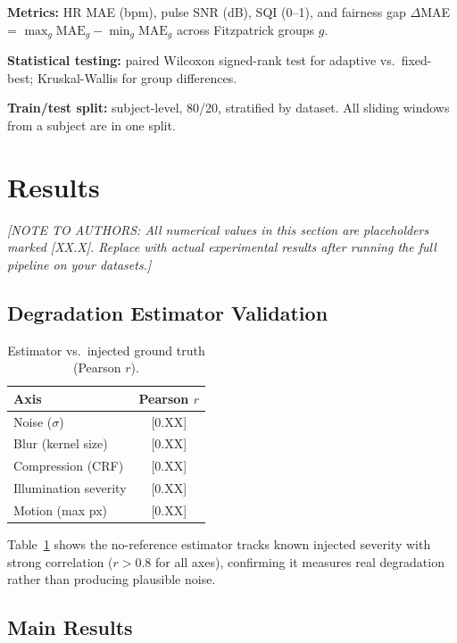 \documentclass[conference]{IEEEtran}
\begin{document}
\textbf{Metrics:} HR MAE (bpm), pulse SNR (dB), SQI (0--1), and fairness gap $\Delta$MAE = $\max_g \text{MAE}_g - \min_g \text{MAE}_g$ across Fitzpatrick groups $g$.

\textbf{Statistical testing:} paired Wilcoxon signed-rank test for adaptive vs.\ fixed-best; Kruskal-Wallis for group differences.

\textbf{Train/test split:} subject-level, 80/20, stratified by dataset. All sliding windows from a subject are in one split.

\section{Results}
\label{sec:results}

\textit{[NOTE TO AUTHORS: All numerical values in this section are placeholders marked [XX.X]. Replace with actual experimental results after running the full pipeline on your datasets.]}

\subsection{Degradation Estimator Validation}
\label{subsec:est_results}

\begin{table}[t]
\centering
\caption{Estimator vs.\ injected ground truth (Pearson $r$).}
\label{tab:estimator_validation}
\begin{tabular}{@{}lc@{}}
\toprule
Axis & Pearson $r$ \\
\midrule
Noise ($\sigma$) & [0.XX] \\
Blur (kernel size) & [0.XX] \\
Compression (CRF) & [0.XX] \\
Illumination severity & [0.XX] \\
Motion (max px) & [0.XX] \\
\bottomrule
\end{tabular}
\end{table}

Table~\ref{tab:estimator_validation} shows the no-reference estimator tracks known injected severity with strong correlation ($r > 0.8$ for all axes), confirming it measures real degradation rather than producing plausible noise.

\subsection{Main Results}
\label{subsec:main_results}
\end{document}
